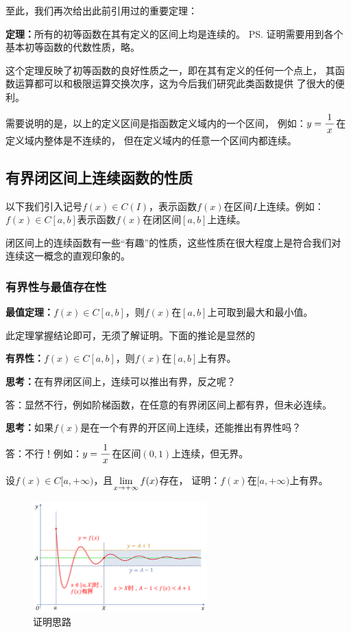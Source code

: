 至此，我们再次给出此前引用过的重要定理：
\begin{thx}
	{\bf 定理：}所有的初等函数在其有定义的区间上均是连续的。
	\ps{证明需要用到各个基本初等函数的代数性质，略。}
\end{thx}
这个定理反映了初等函数的良好性质之一，即在其有定义的任何一个点上，
其函数运算都可以和极限运算交换次序，这为今后我们研究此类函数提供
了很大的便利。

需要说明的是，以上的定义区间是指函数定义域内的一个区间，
例如：$y=\displaystyle\frac{\,{1}\,}{\,{x}\,}$在定义域内整体是不连续的，
但在定义域内的任意一个区间内都连续。

\subsection{有界闭区间上连续函数的性质}

以下我们引入记号$f(x)\in C(I)$，表示函数$f(x)$在区间$I$上连续。例如：
$f(x)\in C[a,b]$表示函数$f(x)$在闭区间$[a,b]$上连续。

闭区间上的连续函数有一些“有趣”的性质，这些性质在很大程度上是符合我们对
连续这一概念的直观印象的。

\subsubsection{有界性与最值存在性}

\begin{thx}
	{\bf 最值定理：}$f(x)\in C[a,b]$，则$f(x)$在$[a,b]$上可取到最大和最小值。
\end{thx}

此定理掌握结论即可，无须了解证明。下面的推论是显然的

\begin{thx}
	{\bf 有界性：}$f(x)\in C[a,b]$，则$f(x)$在$[a,b]$上有界。
\end{thx}

\bs
{\bf 思考：}在有界闭区间上，连续可以推出有界，反之呢？

\ifhint
答：显然不行，例如阶梯函数，在任意的有界闭区间上都有界，但未必连续。
\fi

\bs
{\bf 思考：}如果$f(x)$是在一个有界的开区间上连续，还能推出有界性吗？

\ifhint
答：不行！例如：$y=\displaystyle\frac{\,{1}\,}{\,{x}\,}$在区间$(0,1)$上连续，但无界。 
\fi

\bs
\egz 设$f(x)\in C[a,+\infty)$，且$\lim\limits_{x\to{+\infty}}f(x)$存在，
证明：$f(x)$在$[a,+\infty)$上有界。

\begin{figure}[h]
	\centering
	\includegraphics[width=0.6\textwidth]{./Images/Ch01/finfconvb.pdf}
	\caption{\exNo 证明思路}
	\label{fig:finfconvb}
\end{figure}

